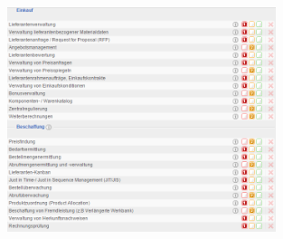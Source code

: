 \documentclass[12pt]{article}
\begin{document}
\noindent
\begin{figure}[!h]
\centering
\includegraphics[width=0.7\textwidth]{images/tr20}
\end{figure}\FloatBarrier
\noindent
\end{document}
